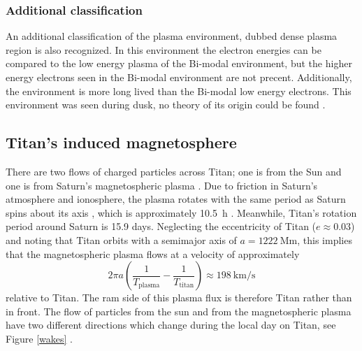 \documentclass[12pt, parskip=full*, abstract]{scrartcl}
\begin{document}
\subsubsection{Additional classification}%
An additional classification of the plasma environment, dubbed dense plasma region is also recognized. In this environment the electron energies can be compared to the low energy plasma of the Bi-modal environment, but the higher energy electrons seen in the Bi-modal environment are not precent. Additionally, the environment is more long lived than the Bi-modal low energy electrons. This environment was seen during dusk, no theory of its origin could be found \parencite{Smith-WithOrWithoutTitan}.





































\subsection{Titan's induced magnetosphere}

There are two flows of charged particles across Titan; one is from the Sun and one is from Saturn's magnetospheric plasma \parencite{ionosphere-magnetosphere-interaction-coates}. Due to friction in Saturn's atmosphere and ionosphere, the plasma rotates with the same period as Saturn spins about its axis \parencite{solar-system-magnetospheres}, which is approximately \SI{10.5}{\hour} \parencite{fundamental-planetary-science}. Meanwhile, Titan's rotation period around Saturn is 15.9 days. Neglecting the eccentricity of Titan ($e\approx0.03$) and noting that Titan orbits with a semimajor axis of $a=\SI{1222}{\mega\metre}$, this implies that the magnetospheric plasma flows at a velocity of approximately
\begin{equation}
	2\pi a\left(\frac{1}{T_\text{plasma}} - \frac{1}{T_\text{titan}}\right)\approx\SI{198}{\kilo\metre\per\second}
\end{equation}
relative to Titan. The ram side of this plasma flux is therefore  Titan rather than in front. The flow of particles from the sun and from the magnetospheric plasma have two different directions which change during the local day on Titan, see Figure \ref{wakes} \parencite{ionosphere-magnetosphere-interaction-coates}.
\end{document}
